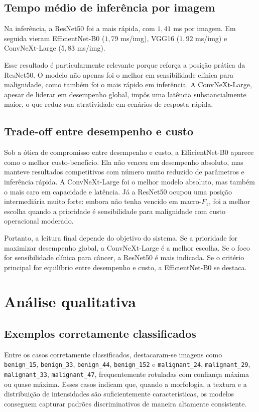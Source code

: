 \documentclass[tcc,capa]{texufpel}
\begin{document}
\subsection{Tempo médio de inferência por imagem}

Na inferência, a ResNet50 foi a mais rápida, com \(1{,}41\) ms por imagem. Em seguida vieram EfficientNet-B0 (\(1{,}79\) ms/img), VGG16 (\(1{,}92\) ms/img) e ConvNeXt-Large (\(5{,}83\) ms/img).

Esse resultado é particularmente relevante porque reforça a posição prática da ResNet50. O modelo não apenas foi o melhor em sensibilidade clínica para malignidade, como também foi o mais rápido em inferência. A ConvNeXt-Large, apesar de liderar em desempenho global, impôs uma latência substancialmente maior, o que reduz sua atratividade em cenários de resposta rápida.

\subsection{Trade-off entre desempenho e custo}

Sob a ótica de compromisso entre desempenho e custo, a EfficientNet-B0 aparece como o melhor custo-benefício. Ela não venceu em desempenho absoluto, mas manteve resultados competitivos com número muito reduzido de parâmetros e inferência rápida. A ConvNeXt-Large foi o melhor modelo absoluto, mas também o mais caro em capacidade e latência. Já a ResNet50 ocupou uma posição intermediária muito forte: embora não tenha vencido em macro-\(F_1\), foi a melhor escolha quando a prioridade é sensibilidade para malignidade com custo operacional moderado.

Portanto, a leitura final depende do objetivo do sistema. Se a prioridade for maximizar desempenho global, a ConvNeXt-Large é a melhor escolha. Se o foco for sensibilidade clínica para câncer, a ResNet50 é mais indicada. Se o critério principal for equilíbrio entre desempenho e custo, a EfficientNet-B0 se destaca.

\section{Análise qualitativa}

\subsection{Exemplos corretamente classificados}

Entre os casos corretamente classificados, destacaram-se imagens como \texttt{benign\_15}, \texttt{benign\_33}, \texttt{benign\_44}, \texttt{benign\_152} e \texttt{malignant\_24}, \texttt{malignant\_29}, \texttt{malignant\_33}, \texttt{malignant\_47}, frequentemente rotuladas com confiança máxima ou quase máxima. Esses casos indicam que, quando a morfologia, a textura e a distribuição de intensidades são suficientemente características, os modelos conseguem capturar padrões discriminativos de maneira altamente consistente.
\end{document}
